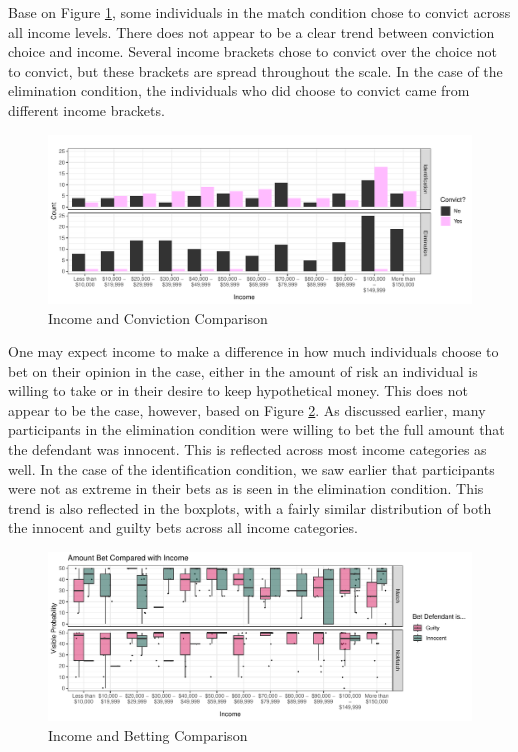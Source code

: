 \documentclass[print]{nuthesis}
\begin{document}
Base on Figure \ref{fig:convictsincome}, some individuals in the match condition chose to convict across all income levels.
There does not appear to be a clear trend between conviction choice and income.
Several income brackets chose to convict over the choice not to convict, but these brackets are spread throughout the scale.
In the case of the elimination condition, the individuals who did choose to convict came from different income brackets.

\begin{figure}

{\centering \includegraphics[width=\linewidth]{thesis_files/figure-latex/convictsincome-1} 

}

\caption{Income and Conviction Comparison}\label{fig:convictsincome}
\end{figure}

One may expect income to make a difference in how much individuals choose to bet on their opinion in the case, either in the amount of risk an individual is willing to take or in their desire to keep hypothetical money.
This does not appear to be the case, however, based on Figure \ref{fig:incomebet}.
As discussed earlier, many participants in the elimination condition were willing to bet the full amount that the defendant was innocent.
This is reflected across most income categories as well.
In the case of the identification condition, we saw earlier that participants were not as extreme in their bets as is seen in the elimination condition.
This trend is also reflected in the boxplots, with a fairly similar distribution of both the innocent and guilty bets across all income categories.

\begin{figure}

{\centering \includegraphics[width=\linewidth]{thesis_files/figure-latex/incomebet-1} 

}

\caption{Income and Betting Comparison}\label{fig:incomebet}
\end{figure}
\end{document}
